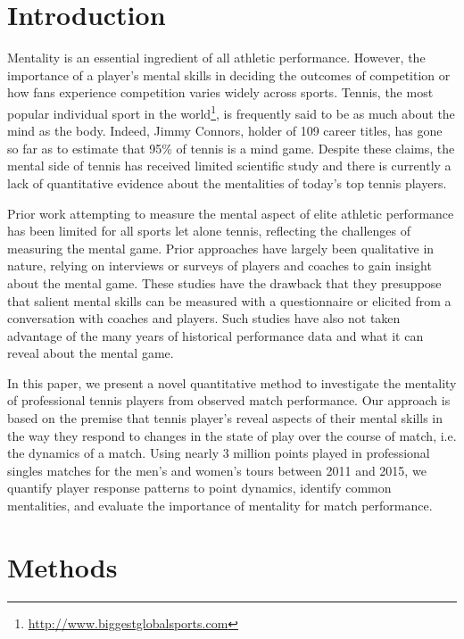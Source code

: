 \documentclass{Latex/svjour3}
\begin{document}
\section{Introduction}

Mentality is an essential ingredient of all athletic performance. However, the
importance of a player's mental skills in deciding the outcomes of competition
or how fans experience competition varies widely across sports. Tennis, the most
popular individual sport in the
world\footnote{\url{http://www.biggestglobalsports.com}}, is frequently said to
be as much about the mind as the body. Indeed, Jimmy Connors, holder of 109
career titles, has gone so far as to estimate that 95\% of tennis is a mind
game\cite{samulski2007tennis}. Despite these claims, the mental side of tennis
has received limited scientific study and there is currently a lack of
quantitative evidence about the mentalities of today's top tennis players.

Prior work attempting to measure the mental aspect of elite athletic performance
has been limited for all sports let alone tennis, reflecting the challenges of
measuring the mental game. Prior approaches have largely been qualitative in
nature, relying on interviews\cite{young2011understanding} or
surveys\cite{taylor1987predicting} of players and coaches to gain insight about
the mental game. These studies have the drawback that they presuppose that
salient mental skills can be measured with a questionnaire or elicited from a
conversation with coaches and players. Such studies have also not taken
advantage of the many years of historical performance data and what it can
reveal about the mental game.

In this paper, we present a novel quantitative method to investigate the
mentality of professional tennis players from observed match performance. Our
approach is based on the premise that tennis player's reveal aspects of their
mental skills in the way they respond to changes in the state of play over the
course of match, i.e. the dynamics of a match. Using nearly 3 million points
played in professional singles matches for the men's and women's tours between
2011 and 2015, we quantify player response patterns to point dynamics, identify
common mentalities, and evaluate the importance of mentality for match
performance.


\section{Methods}
\end{document}
